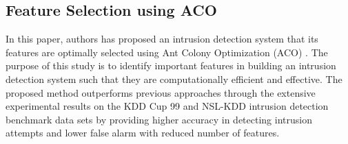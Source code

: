 \documentclass[a4paper]{article}
\begin{document}
% 
%	
%


\subsection{Feature Selection using ACO}
In this paper, authors has proposed an intrusion detection system that its features are optimally selected using Ant Colony Optimization (ACO)  \cite{aghdam2016feature}. The purpose of this study is to identify important features in building an intrusion detection system such that they are computationally efficient and effective. The proposed method outperforms previous approaches through the extensive experimental results on the KDD Cup 99 and NSL-KDD intrusion detection benchmark data sets by providing higher accuracy in detecting intrusion attempts and lower false alarm with reduced number of features.
\end{document}
